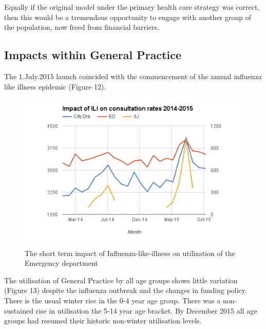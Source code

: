 \documentclass[11pt,a4paper]{article}
\begin{document}
Equally if the original model under the primary health care strategy was correct, then this would be a tremendous opportunity to engage with another group of the population, now freed from financial barriers.\\ 


\subsection{Impacts within General Practice}
The 1.July.2015 launch coincided with the commencement of the annual influenza like illness epidemic (Figure 12). \\


\begin{figure}[htp]
\centering
\includegraphics[scale=0.50]{ILI.png}
\caption{The short term impact of Influenza-like-illness on utilization of the Emergency department}
\label{Impact of Influenza-like-illness}
\end{figure}


The utilisation of General Practice by all age groups shows little variation (Figure 13) despite the influenza outbreak and the changes in funding policy. There is the usual winter rise in the 0-4 year age group. There was a non-sustained rise in utilisation the 5-14 year age bracket. By December 2015 all age groups had resumed their historic non-winter utilisation levels. \\
\end{document}
